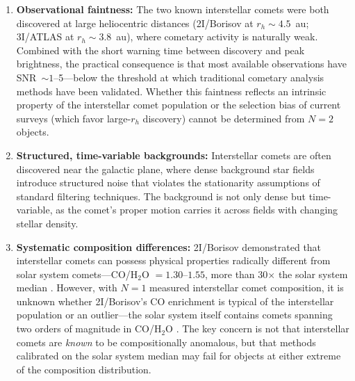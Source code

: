 \documentclass[usenatbib]{mnras}
\begin{document}
\begin{enumerate}
    \item \textbf{Observational faintness:} The two known interstellar comets were both discovered at large heliocentric distances (2I/Borisov at $r_h \sim 4.5$~au; 3I/ATLAS at $r_h \sim 3.8$~au), where cometary activity is naturally weak. Combined with the short warning time between discovery and peak brightness, the practical consequence is that most available observations have SNR~$\sim 1$--5---below the threshold at which traditional cometary analysis methods have been validated. Whether this faintness reflects an intrinsic property of the interstellar comet population or the selection bias of current surveys (which favor large-$r_h$ discovery) cannot be determined from $N=2$ objects.
    \item \textbf{Structured, time-variable backgrounds:} Interstellar comets are often discovered near the galactic plane, where dense background star fields introduce structured noise that violates the stationarity assumptions of standard filtering techniques. The background is not only dense but time-variable, as the comet's proper motion carries it across fields with changing stellar density.
    \item \textbf{Systematic composition differences:} 2I/Borisov demonstrated that interstellar comets can possess physical properties radically different from solar system comets---CO/H$_2$O $= 1.30$--$1.55$, more than 30$\times$ the solar system median \citep{bodewits20,opitom21}. However, with $N=1$ measured interstellar comet composition, it is unknown whether 2I/Borisov's CO enrichment is typical of the interstellar population or an outlier---the solar system itself contains comets spanning two orders of magnitude in CO/H$_2$O \citep{bockelee04}. The key concern is not that interstellar comets are \textit{known} to be compositionally anomalous, but that methods calibrated on the solar system median may fail for objects at either extreme of the composition distribution.
\end{enumerate}
\end{document}
